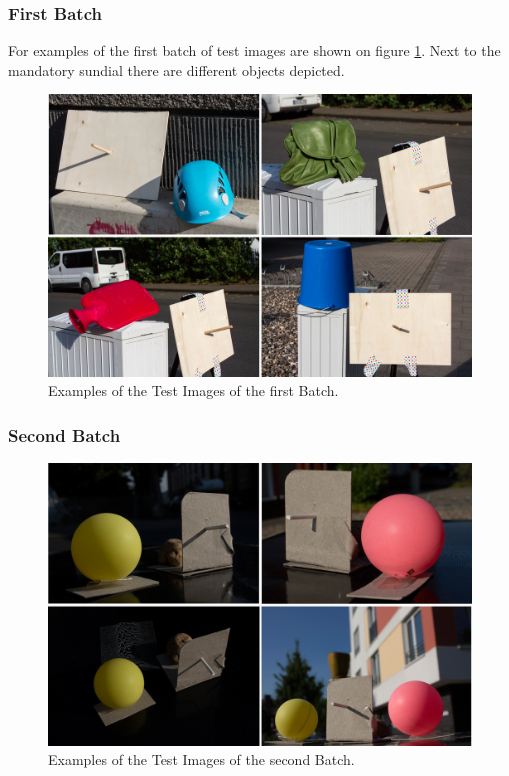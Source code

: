 \subsubsection{First Batch} \label{sec:testimagesfirst}

For examples of the first batch of test images are shown on figure \ref{fig:batch1}. Next to the mandatory sundial there are different objects depicted.

\begin{figure}[H] 
	\center 
	\includegraphics[width=12cm]{Images/batch1.jpg}			
	\caption[Examples of the Test Images of the first Batch.]{Examples of the Test Images of the first Batch.}
	\label{fig:batch1}
\end{figure}

\subsubsection{Second Batch} \label{sec:testimagessecond}


\begin{figure}[H] 
	\center 
	\includegraphics[width=12cm]{Images/batch2.jpg}			
	\caption[Examples of the Test Images of the second Batch.]{Examples of the Test Images of the second Batch.}
	\label{fig:batch2}
\end{figure}

\newpage